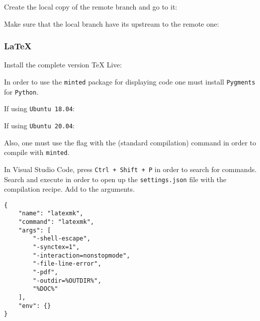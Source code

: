
Create the local copy of the remote branch and go to it:


Make sure that the local branch have its upstream to the remote one:


\subsubsection{LaTeX}

Install the complete version TeX Live:


In order to use the \texttt{minted} package for displaying code one must install \texttt{Pygments} for \texttt{Python}.

If using \texttt{Ubuntu 18.04}:


If using \texttt{Ubuntu 20.04}:


Also, one must use the  flag with the  (standard compilation) command in order to compile with \texttt{minted}.

In Visual Studio Code, press \texttt{Ctrl + Shift + P} in order to search for commands. Search and execute  in order to open up the \texttt{settings.json} file with the compilation recipe. Add  to the arguments.

\begin{verbatim}
{
    "name": "latexmk",
    "command": "latexmk",
    "args": [
        "-shell-escape",
        "-synctex=1",
        "-interaction=nonstopmode",
        "-file-line-error",
        "-pdf",
        "-outdir=%OUTDIR%",
        "%DOC%"
    ],
    "env": {}
}
\end{verbatim}